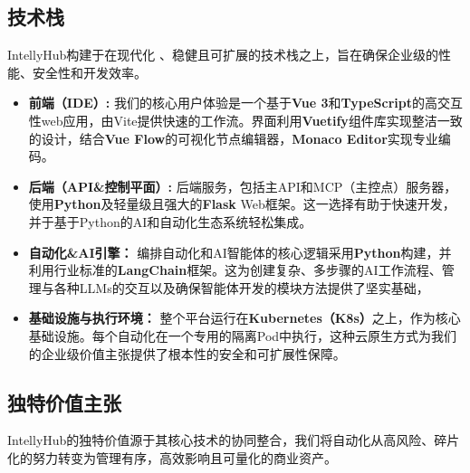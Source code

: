 \documentclass[11点, A4纸, 单面]{article}
\begin{document}
\pagebreak
\subsection{技术栈}
IntellyHub构建于在现代化 、稳健且可扩展的技术栈之上，旨在确保企业级的性能、安全性和开发效率。

\begin{itemize}
\item \textbf{前端（IDE）:}  我们的核心用户体验是一个基于\textbf{Vue 3}和\textbf{TypeScript}的高交互性web应用，由Vite提供快速的工作流。界面利用\textbf{Vuetify}组件库实现整洁一致的设计，结合\textbf{Vue Flow}的可视化节点编辑器，\textbf{Monaco Editor}实现专业编码。
\item \textbf{后端（API\&控制平面）:} 后端服务，包括主API和MCP（主控点）服务器，使用\textbf{Python}及轻量级且强大的\textbf{Flask} Web框架。这一选择有助于快速开发，并于基于Python的AI和自动化生态系统轻松集成。
\item \textbf{自动化\&AI引擎：} 编排自动化和AI智能体的核心逻辑采用\textbf{Python}构建，并利用行业标准的\textbf{LangChain}框架。这为创建复杂、多步骤的AI工作流程、管理与各种LLMs的交互以及确保智能体开发的模块方法提供了坚实基础，
\item \textbf{基础设施与执行环境：} 整个平台运行在\textbf{Kubernetes（K8s）}之上，作为核心基础设施。每个自动化在一个专用的隔离Pod中执行，这种云原生方式为我们的企业级价值主张提供了根本性的安全和可扩展性保障。
\end{itemize}

\subsection{独特价值主张}
IntellyHub的独特价值源于其核心技术的协同整合，我们将自动化从高风险、碎片化的努力转变为管理有序，高效影响且可量化的商业资产。 
\end{document}
